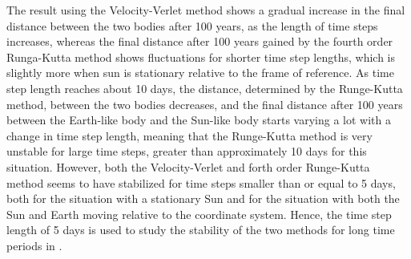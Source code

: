The result using the Velocity-Verlet method shows a gradual increase in the final distance between the two bodies after 100 years, as the length of time steps increases, whereas the final distance after 100 years gained by the fourth order Runga-Kutta method shows fluctuations for shorter time step lengths, which is slightly more when sun is stationary relative to the frame of reference.
As time step length reaches about 10 days, the distance, determined by the Runge-Kutta method, between the two bodies decreases, and the final distance after 100 years between the Earth-like body and the Sun-like body starts varying a lot with a change in time step length, meaning that the Runge-Kutta method is very unstable for large time steps, greater than approximately 10 days for this situation.
However, both the Velocity-Verlet and forth order Runge-Kutta method seems to have stabilized for time steps smaller than or equal to 5 days, both for the situation with a stationary Sun and for the situation with both the Sun and Earth moving relative to the coordinate system.
Hence, the time step length of 5 days is used to study the stability of the two methods for long time periods in .
